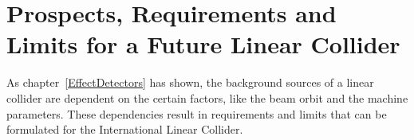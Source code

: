 \chapter{Prospects, Requirements and Limits for a Future Linear Collider}
\label{Results}

As chapter~\ref{EffectDetectors} has shown, the background sources of a linear collider are dependent on the certain factors, like the beam orbit and the machine parameters.
These dependencies result in requirements and limits that can be formulated for the International Linear Collider.